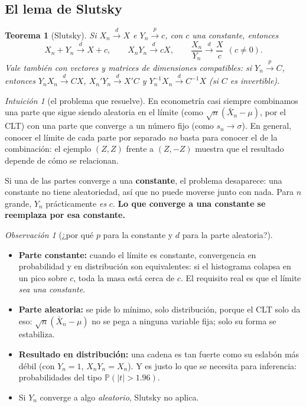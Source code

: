 \documentclass[11pt,a4paper]{article}
\theoremstyle{plain}
\newtheorem{teorema}{Teorema}[section]
\theoremstyle{definition}
\theoremstyle{remark}
\newtheorem*{intuicion}{Intuición}
\newtheorem*{observacion}{Observación}
\renewcommand{\P}{\mathbb{P}}
\newcommand{\cp}{\xrightarrow{\;p\;}}
\newcommand{\cd}{\xrightarrow{\;d\;}}
\begin{document}
\subsection{El lema de Slutsky}

\begin{teorema}[Slutsky]\label{teo:slutsky}
Si $X_n\cd X$ e $Y_n\cp c$, con $c$ una constante, entonces
\[
X_n+Y_n\cd X+c,\qquad X_nY_n\cd cX,\qquad \frac{X_n}{Y_n}\cd\frac{X}{c}\ \ (c\neq0).
\]
Vale también con vectores y matrices de dimensiones compatibles: si $Y_n\cp C$, entonces
$Y_nX_n\cd CX$, $X_n'Y_n\cd X'C$ y $Y_n^{-1}X_n\cd C^{-1}X$ (si $C$ es invertible).
\end{teorema}

\begin{intuicion}[el problema que resuelve]
En econometría casi siempre combinamos una parte que sigue siendo aleatoria en el límite
(como $\sqrt n(\bar X_n-\mu)$, por el CLT) con una parte que converge a un número fijo (como
$s_n\to\sigma$). En general, conocer el límite de cada parte por separado \emph{no} basta para
conocer el de la combinación: el ejemplo $(Z,Z)$ frente a $(Z,-Z)$ muestra que el resultado
depende de cómo se relacionan.

Si una de las partes converge a una \textbf{constante}, el problema desaparece: una constante no
tiene aleatoriedad, así que no puede moverse junto con nada. Para $n$ grande, $Y_n$
prácticamente \emph{es} $c$. \textbf{Lo que converge a una constante se reemplaza por esa
constante.}
\end{intuicion}

\begin{observacion}[¿por qué $p$ para la constante y $d$ para la parte aleatoria?]\leavevmode
\begin{itemize}
  \item \textbf{Parte constante:} cuando el límite es constante, convergencia en probabilidad y
        en distribución son equivalentes: si el histograma colapsa en un pico sobre $c$, toda la masa
        está cerca de $c$. El requisito real es que
        el límite \emph{sea una constante}.
  \item \textbf{Parte aleatoria:} se pide lo mínimo, solo distribución, porque el CLT solo da eso:
        $\sqrt n(\bar X_n-\mu)$ no se pega a ninguna variable fija; solo su forma se estabiliza.
  \item \textbf{Resultado en distribución:} una cadena es tan fuerte como su eslabón más débil
        (con $Y_n=1$, $X_nY_n=X_n$). Y es justo lo que se necesita para inferencia: probabilidades
        del tipo $\P(|t|>1.96)$.
  \item Si $Y_n$ converge a algo \emph{aleatorio}, Slutsky no aplica.
\end{itemize}
\end{observacion}
\end{document}
